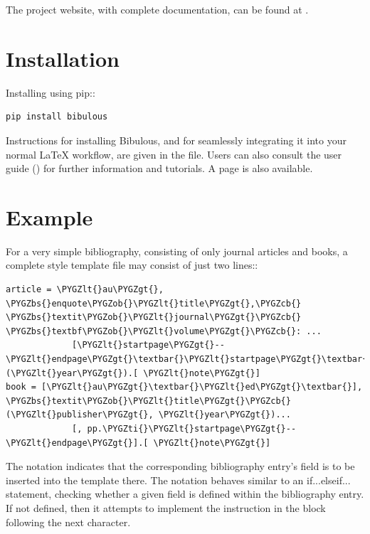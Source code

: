 \documentclass[letterpaper,10pt,english]{sphinxmanual}
\def\PYGZbs{\char`\\}
\def\PYGZob{\char`\{}
\def\PYGZcb{\char`\}}
\def\PYGZlt{\char`\<}
\def\PYGZgt{\char`\>}
\def\PYGZti{\char`\~}
\begin{document}
The project website, with complete documentation, can be found at .


\section{Installation}
\label{index:installation}
Installing using pip::

\begin{Verbatim}[commandchars=\\\{\}]
pip install bibulous
\end{Verbatim}

Instructions for installing Bibulous, and for seamlessly integrating it into your normal LaTeX workflow, are given in the  file. Users can also consult the user guide () for further information and tutorials. A  page is also available.


\section{Example}
\label{index:example}
For a very simple bibliography, consisting of only journal articles and books, a complete style template file may consist of just two lines::

\begin{Verbatim}[commandchars=\\\{\}]
article = \PYGZlt{}au\PYGZgt{}, \PYGZbs{}enquote\PYGZob{}\PYGZlt{}title\PYGZgt{},\PYGZcb{} \PYGZbs{}textit\PYGZob{}\PYGZlt{}journal\PYGZgt{}\PYGZcb{} \PYGZbs{}textbf\PYGZob{}\PYGZlt{}volume\PYGZgt{}\PYGZcb{}: ...
             [\PYGZlt{}startpage\PYGZgt{}--\PYGZlt{}endpage\PYGZgt{}\textbar{}\PYGZlt{}startpage\PYGZgt{}\textbar{}\PYGZlt{}eid\PYGZgt{}\textbar{}] (\PYGZlt{}year\PYGZgt{}).[ \PYGZlt{}note\PYGZgt{}]
book = [\PYGZlt{}au\PYGZgt{}\textbar{}\PYGZlt{}ed\PYGZgt{}\textbar{}], \PYGZbs{}textit\PYGZob{}\PYGZlt{}title\PYGZgt{}\PYGZcb{} (\PYGZlt{}publisher\PYGZgt{}, \PYGZlt{}year\PYGZgt{})...
             [, pp.\PYGZti{}\PYGZlt{}startpage\PYGZgt{}--\PYGZlt{}endpage\PYGZgt{}].[ \PYGZlt{}note\PYGZgt{}]
\end{Verbatim}

The  notation indicates that the corresponding bibliography entry's field is to be inserted into the template there. The \code{{[}...\textbar{}...{]}} notation behaves similar to an if...elseif... statement, checking whether a given field is defined within the bibliography entry. If not defined, then it attempts to implement the instruction in the block following the next \code{\textbar{}} character.
\end{document}
